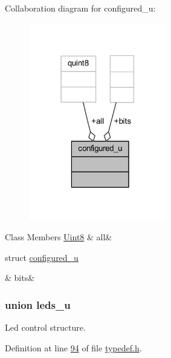 Collaboration diagram for configured\+\_\+u\+:
\nopagebreak
\begin{figure}[H]
\begin{center}
\leavevmode
\includegraphics[width=170pt]{d0/d53/a00232}
\end{center}
\end{figure}
\begin{DoxyFields}{Class Members}
\hypertarget{a00001_a4d5d0180cf0bb727c1b49ecfadef8136}{\hyperlink{a00001_a979e3e23b9a449e69ab6a8a83b6042f8}{Uint8}}\label{a00001_a4d5d0180cf0bb727c1b49ecfadef8136}
&
all&
\\
\hline

\hypertarget{a00001_a40a64031cced6d5ffa4d679041db08d8}{struct \hyperlink{a00001_d1/d6f/a00063}{configured\+\_\+u}}\label{a00001_a40a64031cced6d5ffa4d679041db08d8}
&
bits&
\\
\hline

\end{DoxyFields}
\label{df/d5d/a00084}
\hypertarget{a00001_df/d5d/a00084}{}
\subsubsection{union leds\+\_\+u}
Led control structure. 

Definition at line \hyperlink{a00001_source_l00094}{94} of file \hyperlink{a00001_source}{typedef.\+h}.



